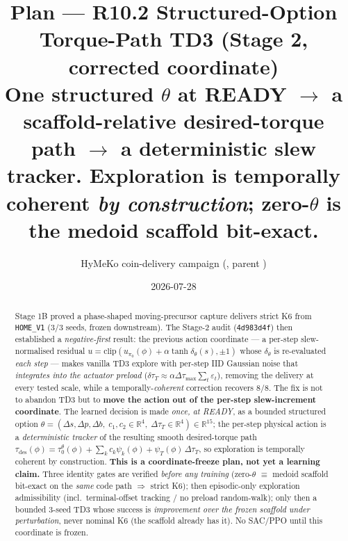 \documentclass[11pt]{article}
\title{\textbf{Plan --- R10.2 Structured-Option Torque-Path TD3 (Stage 2, corrected coordinate)}\\[2pt]
\large One structured $\theta$ at READY $\to$ a scaffold-relative desired-torque path $\to$ a deterministic slew tracker.
Exploration is temporally coherent \emph{by construction}; zero-$\theta$ is the medoid scaffold bit-exact.}
\author{HyMeKo coin-delivery campaign \quad(\code{recovery/coin-r9-causal-residual-delivery}, parent \code{4d983d4f})}
\date{2026-07-28}
\newcommand{\code}[1]{\texttt{\small #1}}
\newcommand{\slew}{\ensuremath{\Delta\tau_{\max}}}
\begin{document}
\maketitle

\begin{abstract}
\noindent Stage 1B proved a phase-shaped moving-precursor capture delivers strict K6 from \code{HOME\_V1} (3/3 seeds,
frozen downstream). The Stage-2 audit (\code{4d983d4f}) then established a \emph{negative-first} result: the previous
action coordinate --- a per-step slew-normalised residual $u=\mathrm{clip}(u_{\pi_0}(\phi)+\alpha\tanh\delta_\theta(s),\pm1)$
whose $\delta_\theta$ is re-evaluated \emph{each step} --- makes vanilla TD3 explore with per-step IID Gaussian noise that
\emph{integrates into the actuator preload} ($\delta\tau_T\!\approx\!\alpha\slew\sum_t\varepsilon_t$), removing the delivery
at every tested scale, while a temporally-\emph{coherent} correction recovers $8/8$. The fix is not to abandon TD3 but to
\textbf{move the action out of the per-step slew-increment coordinate}. The learned decision is made \emph{once, at READY},
as a bounded structured option
$\theta=(\Delta s,\Delta p,\Delta b,\;c_1,c_2\in\mathbb{R}^4,\;\Delta\tau_T\in\mathbb{R}^4)\in\mathbb{R}^{15}$;
the per-step physical action is a \emph{deterministic tracker} of the resulting smooth desired-torque path
$\tau_{\mathrm{des}}(\phi)=\tau_0^\theta(\phi)+\sum_k c_k\psi_k(\phi)+\psi_T(\phi)\,\Delta\tau_T$, so exploration is
temporally coherent by construction. \textbf{This is a coordinate-freeze plan, not yet a learning claim.} Three identity
gates are verified \emph{before any training} (zero-$\theta$ $\equiv$ medoid scaffold bit-exact on the \emph{same} code path
$\Rightarrow$ strict K6); then episodic-only exploration admissibility (incl.\ terminal-offset tracking / no preload
random-walk); only then a bounded 3-seed TD3 whose success is \emph{improvement over the frozen scaffold under
perturbation}, never nominal K6 (the scaffold already has it). No SAC/PPO until this coordinate is frozen.
\end{abstract}
\end{document}
